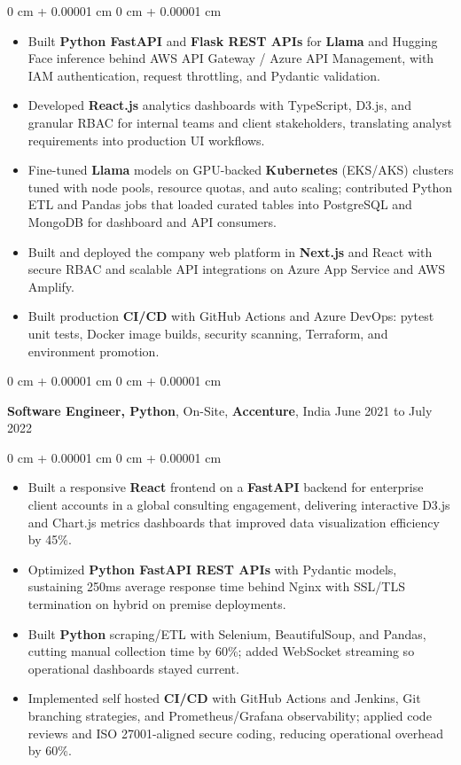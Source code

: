 \documentclass[10pt, letterpaper]{article}
\newenvironment{highlights}{
    \begin{itemize}[
        topsep=0.04 cm,
        parsep=0.04 cm,
        partopsep=0pt,
        itemsep=0pt,
        leftmargin=0 cm + 10pt
    ]
}{
    \end{itemize}
} %
\newenvironment{onecolentry}{
    \begin{adjustwidth}{
        0 cm + 0.00001 cm
    }{
        0 cm + 0.00001 cm
    }
}{
    \end{adjustwidth}
} %
\newcommand{\resumeheading}[2]{%
    \begin{onecolentry}
        #1 \hfill #2
    \end{onecolentry}
} %
\begin{document}
\begin{onecolentry}
\begin{highlights}
	\item Built \textbf{Python FastAPI} and \textbf{Flask REST APIs} for \textbf{Llama} and Hugging Face inference behind AWS API Gateway / Azure API Management, with IAM authentication, request throttling, and Pydantic validation.
	\item Developed \textbf{React.js} analytics dashboards with TypeScript, D3.js, and granular RBAC for internal teams and client stakeholders, translating analyst requirements into production UI workflows.
	\item Fine-tuned \textbf{Llama} models on GPU-backed \textbf{Kubernetes} (EKS/AKS) clusters tuned with node pools, resource quotas, and auto scaling; contributed Python ETL and Pandas jobs that loaded curated tables into PostgreSQL and MongoDB for dashboard and API consumers.
	\item Built and deployed the company web platform in \textbf{Next.js} and React with secure RBAC and scalable API integrations on Azure App Service and AWS Amplify.
	\item Built production \textbf{CI/CD} with GitHub Actions and Azure DevOps: pytest unit tests, Docker image builds, security scanning, Terraform, and environment promotion.
\end{highlights}
\end{onecolentry}




\vspace{0.15 cm}
\resumeheading{\textbf{Software Engineer, Python}, On-Site, \textbf{Accenture}, India}{June 2021 to July 2022}

\begin{onecolentry}
\begin{highlights}
	\item Built a responsive \textbf{React} frontend on a \textbf{FastAPI} backend for enterprise client accounts in a global consulting engagement, delivering interactive D3.js and Chart.js metrics dashboards that improved data visualization efficiency by 45\%.
	\item Optimized \textbf{Python FastAPI REST APIs} with Pydantic models, sustaining 250ms average response time behind Nginx with SSL/TLS termination on hybrid on premise deployments.
	\item Built \textbf{Python} scraping/ETL with Selenium, BeautifulSoup, and Pandas, cutting manual collection time by 60\%; added WebSocket streaming so operational dashboards stayed current.
	\item Implemented self hosted \textbf{CI/CD} with GitHub Actions and Jenkins, Git branching strategies, and Prometheus/Grafana observability; applied code reviews and ISO 27001-aligned secure coding, reducing operational overhead by 60\%.
\end{highlights}
\end{onecolentry}
\end{document}
